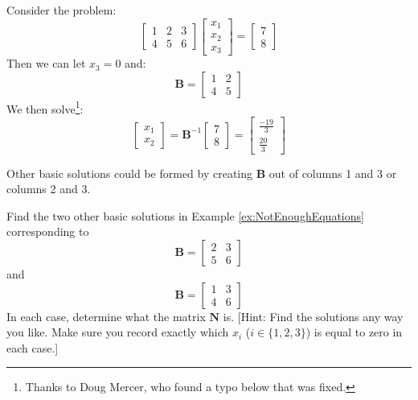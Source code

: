 \begin{example}
Consider the problem:
\begin{equation}
\begin{bmatrix}
1 & 2 & 3\\
4 & 5 & 6
\end{bmatrix}
\begin{bmatrix}
x_1\\
x_2\\
x_3
\end{bmatrix} = 
\begin{bmatrix}
7\\
8
\end{bmatrix}
\end{equation}
Then we can let $x_3 = 0$ and:
\begin{equation}
\mathbf{B} = 
\begin{bmatrix}
1 & 2\\
4 & 5
\end{bmatrix}
\end{equation}
We then solve\footnote{Thanks to Doug Mercer, who found a typo below that was fixed.}:
\begin{equation}
\begin{bmatrix}
x_1\\
x_2
\end{bmatrix} = 
\mathbf{B}^{-1}
\begin{bmatrix}
7\\
8
\end{bmatrix} = 
\begin{bmatrix}
\frac{-19}{3}\\
\frac{20}{3}
\end{bmatrix}
\end{equation}

Other basic solutions could be formed by creating $\mathbf{B}$ out of columns 1 and 3 or columns 2 and 3.
\label{ex:NotEnoughEquations}
\end{example}
\begin{exercise} Find the two other basic solutions in Example \ref{ex:NotEnoughEquations} corresponding to 
\begin{displaymath}
\mathbf{B} = 
\begin{bmatrix}
2 & 3\\
5 & 6
\end{bmatrix}
\end{displaymath}
and
\begin{displaymath}
\mathbf{B} = 
\begin{bmatrix}
1 & 3\\
4 & 6
\end{bmatrix}
\end{displaymath}
In each case, determine what the matrix $\mathbf{N}$ is. [Hint: Find the solutions any way you like. Make sure you record exactly which $x_i$ ($i\in \{1,2,3\}$) is equal to zero in each case.]
\end{exercise}

